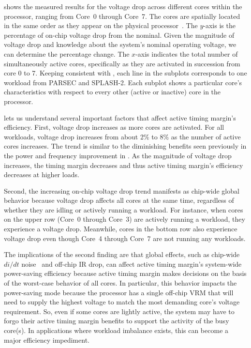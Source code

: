  shows the measured results for the voltage drop across different cores within the processor, ranging from Core~0 through Core~7. The cores are spatially located in the same order as they appear on the physical processor~\cite{zyuban2013ibm}. The $y$-axis is the percentage of on-chip voltage drop from the nominal. Given the magnitude of voltage drop and knowledge about the system's nominal operating voltage, we can determine the percentage change. The $x$-axis indicates the total number of simultaneously active cores, specifically as they are activated in succession from core 0 to 7. Keeping consistent with , each line in the subplots corresponds to one workload from PARSEC and SPLASH-2. Each subplot shows a particular core's characteristics with respect to every other (active or inactive) core in the processor. 

 lets us understand several important factors that affect active timing margin's efficiency. First, voltage drop increases as more cores are activated. For all workloads, voltage drop increases from about 2\% to 8\% as the number of active cores increases. The trend is similar to the diminishing benefits seen previously in the power and frequency improvement in . As the magnitude of voltage drop increases, the timing margin decreases and thus active timing margin's efficiency decreases at higher loads. 

Second, the increasing on-chip voltage drop trend manifests as chip-wide global behavior because voltage drop affects all cores at the same time, regardless of whether they are idling or actively running a workload. For instance, when cores on the upper row (Core~0 through Core~3) are actively running a workload, they experience a voltage drop. Meanwhile, cores in the bottom row also experience voltage drop even though Core~4 through Core~7 are not running any workloads. 

The implications of the second finding are that global effects, such as chip-wide $di/dt$ noise~\cite{gupta2007understanding,miller2012vrsync,bertran2014voltage} and off-chip IR drop, can affect active timing margin's system-wide power-saving efficiency because active timing margin makes decisions on the basis of the worst-case behavior of all cores. In particular, this behavior impacts the power-saving mode because the processor has a single off-chip VRM that will need to supply the highest voltage to match the most demanding core's voltage requirement. So, even if some cores are lightly active, the system may have to forgo their active timing margin benefits to support the activity of the busy core(s). In applications where workload imbalance exists, this can become a major efficiency impediment. 

